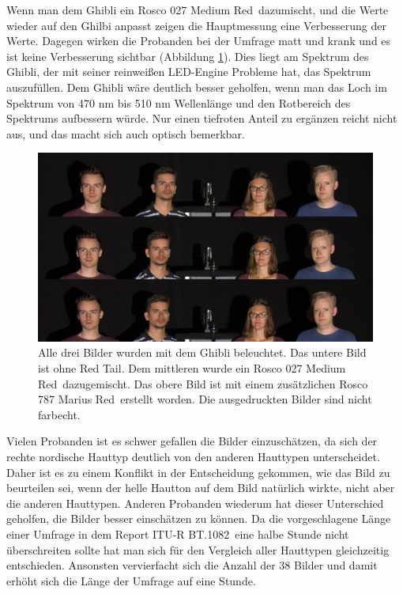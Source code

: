 Wenn man dem Ghibli ein Rosco 027 \glqq Medium Red\grqq\ dazumischt, und die Werte wieder auf den Ghilbi anpasst zeigen die Hauptmessung eine Verbesserung der Werte. Dagegen wirken die Probanden bei der Umfrage matt und krank und es ist keine Verbesserung sichtbar (Abbildung \ref{b_vergleich2}). Dies liegt am Spektrum des Ghibli, der mit seiner reinweißen LED-Engine Probleme hat, das Spektrum auszufüllen. Dem Ghibli wäre deutlich besser geholfen, wenn man das Loch im Spektrum von 470 nm bis 510 nm Wellenlänge und den Rotbereich des Spektrums aufbessern würde. Nur einen tiefroten Anteil zu ergänzen reicht nicht aus, und das macht sich auch optisch bemerkbar.\\

\begin{figure}[H]     %
\centering
\includegraphics[width=1.0\textwidth]{bilder/vergleich2} 
\caption {Alle drei Bilder wurden mit dem Ghibli beleuchtet. Das untere Bild ist ohne \glqq Red Tail\grqq . Dem mittleren wurde ein Rosco 027 \glqq Medium Red\grqq\ dazugemischt. Das obere Bild ist mit einem zusätzlichen Rosco 787 \glqq Marius Red\grqq\ erstellt worden. Die ausgedruckten Bilder sind nicht farbecht.} \label{b_vergleich2}
\end{figure}


Vielen Probanden ist es schwer gefallen die Bilder einzuschätzen, da sich der rechte nordische Hauttyp deutlich von den anderen Hauttypen unterscheidet. Daher ist es zu einem Konflikt in der Entscheidung gekommen, wie das Bild zu beurteilen sei, wenn der helle Hautton auf dem Bild natürlich wirkte, nicht aber die anderen Hauttypen. Anderen Probanden wiederum hat dieser Unterschied geholfen, die Bilder besser einschätzen zu können. Da die vorgeschlagene Länge einer Umfrage in dem \glqq Report ITU-R BT.1082\grqq\ eine halbe Stunde nicht überschreiten sollte hat man sich für den Vergleich aller Hauttypen gleichzeitig entschieden. Ansonsten vervierfacht sich die Anzahl der 38 Bilder und damit erhöht sich die Länge der Umfrage auf eine Stunde. 




